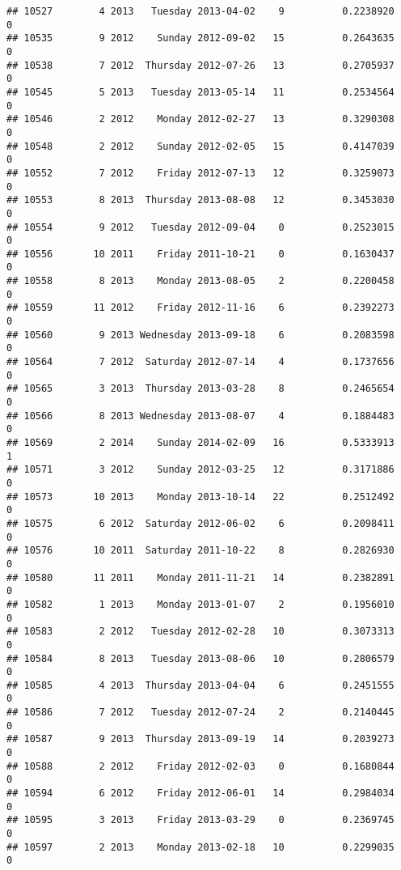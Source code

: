 \documentclass[
]{article}
\begin{document}
\begin{verbatim}
## 10527        4 2013   Tuesday 2013-04-02    9          0.2238920             0
## 10535        9 2012    Sunday 2012-09-02   15          0.2643635             0
## 10538        7 2012  Thursday 2012-07-26   13          0.2705937             0
## 10545        5 2013   Tuesday 2013-05-14   11          0.2534564             0
## 10546        2 2012    Monday 2012-02-27   13          0.3290308             0
## 10548        2 2012    Sunday 2012-02-05   15          0.4147039             0
## 10552        7 2012    Friday 2012-07-13   12          0.3259073             0
## 10553        8 2013  Thursday 2013-08-08   12          0.3453030             0
## 10554        9 2012   Tuesday 2012-09-04    0          0.2523015             0
## 10556       10 2011    Friday 2011-10-21    0          0.1630437             0
## 10558        8 2013    Monday 2013-08-05    2          0.2200458             0
## 10559       11 2012    Friday 2012-11-16    6          0.2392273             0
## 10560        9 2013 Wednesday 2013-09-18    6          0.2083598             0
## 10564        7 2012  Saturday 2012-07-14    4          0.1737656             0
## 10565        3 2013  Thursday 2013-03-28    8          0.2465654             0
## 10566        8 2013 Wednesday 2013-08-07    4          0.1884483             0
## 10569        2 2014    Sunday 2014-02-09   16          0.5333913             1
## 10571        3 2012    Sunday 2012-03-25   12          0.3171886             0
## 10573       10 2013    Monday 2013-10-14   22          0.2512492             0
## 10575        6 2012  Saturday 2012-06-02    6          0.2098411             0
## 10576       10 2011  Saturday 2011-10-22    8          0.2826930             0
## 10580       11 2011    Monday 2011-11-21   14          0.2382891             0
## 10582        1 2013    Monday 2013-01-07    2          0.1956010             0
## 10583        2 2012   Tuesday 2012-02-28   10          0.3073313             0
## 10584        8 2013   Tuesday 2013-08-06   10          0.2806579             0
## 10585        4 2013  Thursday 2013-04-04    6          0.2451555             0
## 10586        7 2012   Tuesday 2012-07-24    2          0.2140445             0
## 10587        9 2013  Thursday 2013-09-19   14          0.2039273             0
## 10588        2 2012    Friday 2012-02-03    0          0.1680844             0
## 10594        6 2012    Friday 2012-06-01   14          0.2984034             0
## 10595        3 2013    Friday 2013-03-29    0          0.2369745             0
## 10597        2 2013    Monday 2013-02-18   10          0.2299035             0

\end{verbatim}
\end{document}

